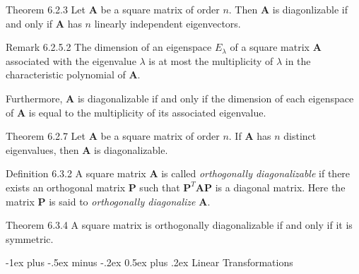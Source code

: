 \documentclass[10pt,landscape]{article}
\makeatletter
\renewcommand{\section}{\@startsection{section}{1}{0mm}%
                                {-1ex plus -.5ex minus -.2ex}%
                                {0.5ex plus .2ex}%
                                {\normalfont\large\bfseries}}
\newcommand{\matr}[1]{\bm{#1}}
\theoremstyle{definition}
\newcommand{\thistheoremname}{}
\newtheorem*{genericthm*}{\thistheoremname}
\newenvironment{namedthm*}[1]
{\renewcommand{\thistheoremname}{#1}\begin{genericthm*}}
{\end{genericthm*}}
\makeatother
\begin{document}
\begin{multicols}{3}
\begin{namedthm*}{Theorem 6.2.3}
    Let \(\matr{A}\) be a square matrix of order \(n\). Then \(\matr{A}\) is diagonlizable if and only if \(\matr{A}\) has \(n\) linearly independent eigenvectors.
\end{namedthm*}

\begin{namedthm*}{Remark 6.2.5.2}
    The dimension of an eigenspace \(E_\lambda\) of a square matrix \(\matr{A}\) associated with the eigenvalue \(\lambda\) is at most the multiplicity of \(\lambda\) in the characteristic polynomial of \(\matr{A}\).

    \medskip
    \noindent
    Furthermore, \(\matr{A}\) is diagonalizable if and only if the dimension of each eigenspace of \(\matr{A}\) is equal to the multiplicity of its associated eigenvalue.
\end{namedthm*}

\begin{namedthm*}{Theorem 6.2.7}
    Let \(\matr{A}\) be a square matrix of order \(n\). If \(\matr{A}\) has \(n\) distinct eigenvalues, then \(\matr{A}\) is diagonalizable.
\end{namedthm*}

\begin{namedthm*}{Definition 6.3.2}
    A square matrix \(\matr{A}\) is called \textit{orthogonally diagonalizable} if there exists an orthogonal matrix \(\matr{P}\) such that \(\matr{P}^T\matr{A}\matr{P}\) is a diagonal matrix. Here the matrix \(\matr{P}\) is said to \textit{orthogonally diagonalize} \(\matr{A}\).
\end{namedthm*}

\begin{namedthm*}{Theorem 6.3.4}
    A square matrix is orthogonally diagonalizable if and only if it is symmetric.
\end{namedthm*}

\section{Linear Transformations}


\end{multicols}
\end{document}
